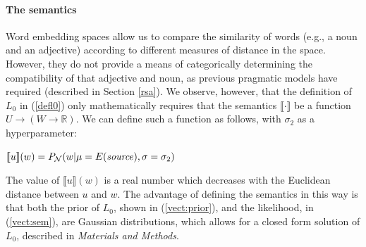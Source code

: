 \documentclass[9pt,twocolumn,twoside,lineno]{pnas-new}
\newcommand{\Listener}{L}
\newcommand{\QLONE}{\Listener_{{1}}^{{Q}}}
\begin{document}
			


	\paragraph{The semantics}



		Word embedding spaces allow us to compare the similarity of words (e.g., a noun and an adjective) according to different measures of distance in the space. However, they do not provide a means of categorically determining the compatibility of that adjective and noun, as previous pragmatic models have required (described in Section \ref{rsa}). We observe, however, that the definition of $L_0$ in (\ref{defl0}) only mathematically requires that the semantics $\llbracket \cdot \rrbracket$ be a function $U\to (W\to \mathbb{R})$. We can define such a function as follows, with $\sigma_2$ as a hyperparameter:
		\begin{examples}
		
		\item $\llbracket u\rrbracket(w) = P_{\mathcal{N}}(w\vert\mu=E(\textrm{\emph{source}}),\sigma=\sigma_2)$ \label{vect:sem}
		\end{examples}





		The value of $\llbracket u\rrbracket(w)$ is a real number which decreases with the Euclidean distance between $u$ and $w$. 
		The advantage of defining the semantics in this way is that both the prior of $L_0$, shown in (\ref{vect:prior}), and the likelihood, in (\ref{vect:sem}), are Gaussian distributions, which allows for a closed form solution of $L_0$, described in \emph{Materials and Methods}. 
\end{document}
